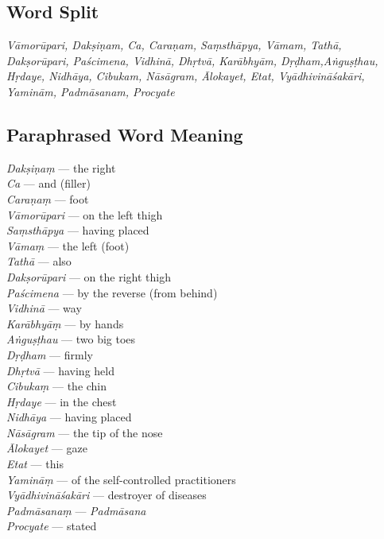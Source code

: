 \subsection*{Word Split}
\vspace{-10pt}

\textit{Vāmorūpari, Dakṣiṇam, Ca, Caraṇam, Saṃsthāpya, Vāmam, Tathā, Dakṣorūpari, Paścimena, Vidhinā, Dhṛtvā, Karābhyām, Dṛḍham,Aṅguṣṭhau, Hṛdaye, Nidhāya, Cibukam, Nāsāgram, Ālokayet, Etat, Vyādhivināśakāri, Yaminām, Padmāsanam, Procyate}
\vspace{-10pt}

\subsection*{Paraphrased Word Meaning}
\vspace{-10pt}

\begin{multicols}{2}
\itemsep=0pt
\textit{Dakṣiṇaṃ} --- the right  \\
\textit{Ca} ---  and (filler)  \\
\textit{Caraṇaṃ} ---  foot  \\
\textit{Vāmorūpari} ---  on the left thigh  \\
\textit{Saṃsthāpya} ---  having placed  \\
\textit{Vāmaṃ} ---  the left (foot) \\
\textit{Tathā} ---  also \\
\textit{Dakṣorūpari} --- on the right thigh \\
\textit{Paścimena} ---  by the reverse (from behind)  \\
\textit{Vidhinā} ---  way \\
\textit{Karābhyāṃ} --- by hands \\
\textit{Aṅguṣṭhau} --- two big toes \\
\textit{Dṛḍham} --- firmly \\
\textit{Dhṛtvā} ---  having held  \\
\textit{Cibukaṃ} ---  the chin \\
\textit{Hṛdaye} ---  in the chest \\
\textit{Nidhāya} ---  having placed \\
\textit{Nāsāgram} --- the tip of the nose  \\
\textit{Ālokayet} ---  gaze \\
\textit{Etat} ---  this \\
\textit{Yamināṃ} ---  of the self-controlled practitioners \\
\textit{Vyādhivināśakāri} ---  destroyer of diseases \\
\textit{Padmāsanaṃ} ---  \textit{Padmāsana} \\
\textit{Procyate} --- stated
\end{multicols}

